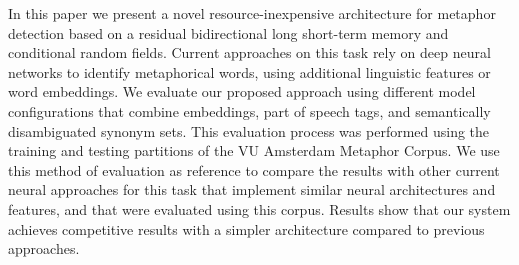 In this paper we present a novel resource-inexpensive architecture for metaphor detection based on a residual bidirectional long short-term memory and conditional random fields. Current approaches on this task rely on deep neural networks to identify metaphorical words, using additional linguistic features or word embeddings. We evaluate our proposed approach using different model configurations that combine embeddings, part of speech tags, and semantically disambiguated synonym sets. This evaluation process was performed using the training and testing partitions of the VU Amsterdam Metaphor Corpus. We use this method of evaluation as reference to compare the results with other current neural approaches for this task that implement similar neural architectures and features, and that were evaluated using this corpus. Results show that our system achieves competitive results with a simpler architecture compared to previous approaches.
